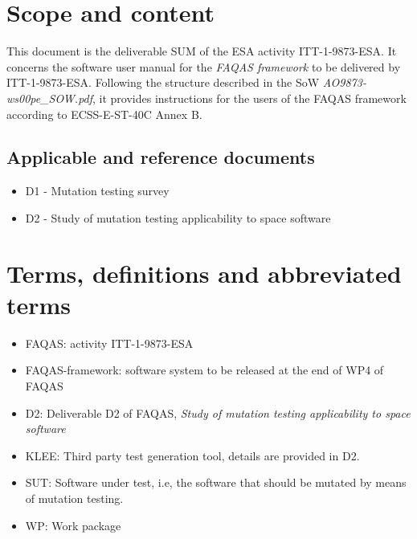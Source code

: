 
\chapter{Scope and content}

This document is the deliverable SUM of the ESA activity ITT-1-9873-ESA. It concerns the software user manual for the \emph{FAQAS framework} to be delivered by ITT-1-9873-ESA. Following the structure described in the SoW \emph{AO9873-ws00pe\_SOW.pdf}, it provides instructions for the users of the FAQAS framework according to ECSS-E-ST-40C Annex B.
 
\section{Applicable and reference documents}

\begin{itemize}
\item{D1 - Mutation testing survey}
\item{D2 - Study of mutation testing applicability to space software}
\end{itemize}

\chapter{Terms, definitions and abbreviated terms}

\begin{itemize}
\item{FAQAS}: activity ITT-1-9873-ESA
\item{FAQAS-framework}: software system to be released at the end of WP4 of FAQAS
\item{D2}: Deliverable D2 of FAQAS, \emph{Study of mutation testing applicability to space software}
\item{KLEE}: Third party test generation tool, details are provided in D2.
\item{SUT}: Software under test, i.e, the software that should be mutated by means of mutation testing.
\item{WP}: Work package
\end{itemize}

\clearpage
 

